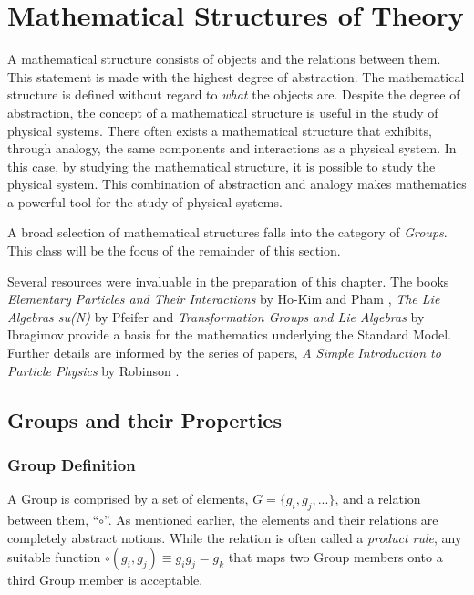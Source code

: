 \section{Mathematical Structures of Theory}

A mathematical structure consists of objects and the relations between them.
This statement is made with the highest degree of abstraction. The mathematical structure is defined without regard to \emph{what} the objects are.
Despite the degree of abstraction, the concept of a mathematical structure is useful in the study of physical systems.
There often exists a mathematical structure that exhibits, through analogy, the same components and interactions as a physical system.
In this case, by studying the mathematical structure, it is possible to study the physical system.
This combination of abstraction and analogy makes mathematics a powerful tool for the study of physical systems.

A broad selection of mathematical structures falls into the category of  \emph{Groups}.
This class will be the focus of the remainder of this section.

Several resources were invaluable in the preparation of this chapter.
The books \emph{Elementary Particles and Their Interactions} by Ho-Kim and Pham \cite{hokim}, \emph{The Lie Algebras su(N)} by Pfeifer\cite{pfeifer} and \emph{Transformation Groups and Lie Algebras} by Ibragimov\cite{ibragimov} provide a basis for the mathematics underlying the Standard Model.
Further details are informed by the series of papers, \emph{A Simple Introduction to Particle Physics} by Robinson \etal \cite{robinson}.

\subsection{Groups and their Properties}

\subsubsection{Group Definition}
A Group is comprised by a set of elements, $G=\{g_i,g_j,...\}$, and a relation between them, ``$\circ$''. 
As mentioned earlier, the elements and their relations are completely abstract notions.
While the relation is often called a \emph{product rule}, any suitable function $\circ(g_i,g_j)\equiv g_ig_j=g_k$ that maps two Group members onto a third Group member is acceptable.

